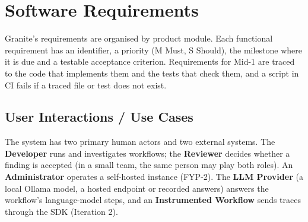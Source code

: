 \documentclass{fast-nuces-bs}
\begin{document}
\chapter{Software Requirements}

Granite's requirements are organised by product module. Each functional requirement has an identifier, a priority (M Must, S Should), the milestone where it is due and a testable acceptance criterion. Requirements for Mid-1 are traced to the code that implements them and the tests that check them, and a script in CI fails if a traced file or test does not exist.

\section{User Interactions / Use Cases}

The system has two primary human actors and two external systems. The \textbf{Developer} runs and investigates workflows; the \textbf{Reviewer} decides whether a finding is accepted (in a small team, the same person may play both roles). An \textbf{Administrator} operates a self-hosted instance (FYP-2). The \textbf{LLM Provider} (a local Ollama model, a hosted endpoint or recorded answers) answers the workflow's language-model steps, and an \textbf{Instrumented Workflow} sends traces through the SDK (Iteration 2).
\end{document}
